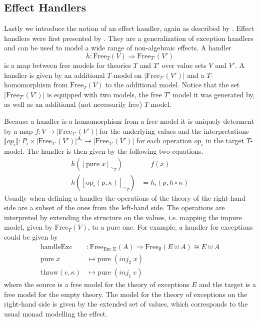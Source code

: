 \subsection{Effect Handlers}
\label{preliminaries:handler}

Lastly we introduce the notion of an effect handler, again as described by
\textcite{DBLP:journals/corr/abs-1807-05923}.
Effect handlers  were first presented by \textcite{DBLP:conf/esop/PlotkinP09}.
They are a generalization of exception handlers and can be used to model a wide
range of non-algebraic effects.
A handler
\[
  h : \mathrm{Free}_{T}(V) \Rightarrow \mathrm{Free}_{T'}(V')
\]
is a map between free models for theories $T$ and $T'$ over value sets $V$ and
$V'$.
A handler is given by an additional $T$-model on $|\mathrm{Free}_{T'}(V')|$ and
a $T$-homomorphism from $\mathrm{Free}_{T}(V)$ to the additional model.
Notice that the set $|\mathrm{Free}_{T'}(V')|$ is equipped with two models, the
free $T'$ model it was generated by, as well as an additional (not necessarily
free) $T$ model.

Because a handler is a homomorphism from a free model it is uniquely determent
by a map $f : V \rightarrow |\mathrm{Free}_{T'}(V')|$ for the underlying
values and the interpretations $\lBrack op_i \rBrack : P_i \times
|\mathrm{Free}_{T'}(V')|^{A_i} \rightarrow |\mathrm{Free}_{T'}(V')|$ for each
operation $op_i$ in the target $T$-model.
The handler is then given by the following two equations.
\begin{align*}
  h([\mathrm{pure}\;x]_{\sim_T}) &= f(x) \\
  h([\mathrm{op}_i(p,\kappa)]_{\sim_T}) &= h_i(p, h\circ\kappa )
\end{align*}
Usually when defining a handler the operations of the theory of the right-hand
side are a subset of the ones from the left-hand side.
The operations are interpreted by extending the structure on the values, i.e.
mapping the impure model, given by $\mathrm{Free}_T(V)$, to a pure one.
For example, a handler for exceptions could be given by
\begin{align*}
  \mathrm{handleExc} &: \mathrm{Free}_{\text{Exc E}}(A) \Rightarrow
  \mathrm{Free}_\emptyset(E \uplus A) \cong E \uplus A \\
  \mathrm{pure}\;x&\mapsto \mathrm{pure}\; (inj_2\; x) \\
  \mathrm{throw}(e, \kappa)&\mapsto \mathrm{pure}\; (inj_1\; e) 
\end{align*}
where the source is a free model for the theory of exceptions $E$ and the target
is a free model for the empty theory.
The model for the theory of exceptions on the right-hand side is given by the
extended set of values, which corresponds to the usual monad modelling the
effect.

